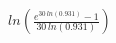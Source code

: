 \documentclass[preview]{standalone}
\begin{document}
\begin{align*}
ln(\frac{e^{30\,ln(0.931)}-1}{30\,ln(0.931)})
\end{align*}
\end{document}
